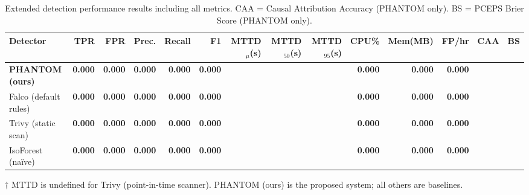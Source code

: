 \begin{table}[h]
\centering
\caption{Extended detection performance results including all metrics. CAA = Causal Attribution Accuracy (PHANTOM only). BS = PCEPS Brier Score (PHANTOM only).}
\label{tab:detection_performance_extended}
\begin{tabular}{lrrrrrrrrrrrrr}
\hline
Detector & TPR & FPR & Prec. & Recall & F1 & MTTD$_\mu$(s) & MTTD$_{50}$(s) & MTTD$_{95}$(s) & CPU\% & Mem(MB) & FP/hr & CAA & BS \\
\hline
\textbf{PHANTOM (ours)} & \textbf{0.000} & \textbf{0.000} & \textbf{0.000} & \textbf{0.000} & \textbf{0.000} & \text{---} & \text{---} & \text{---} & \textbf{0.000} & \textbf{0.000} & \textbf{0.000} & \text{---} & \text{---} \\
Falco (default rules) & \textbf{0.000} & \textbf{0.000} & \textbf{0.000} & \textbf{0.000} & \textbf{0.000} & \text{---} & \text{---} & \text{---} & \textbf{0.000} & \textbf{0.000} & \textbf{0.000} & \text{---} & \text{---} \\
Trivy (static scan) & \textbf{0.000} & \textbf{0.000} & \textbf{0.000} & \textbf{0.000} & \textbf{0.000} & \text{---} & \text{---} & \text{---} & \textbf{0.000} & \textbf{0.000} & \textbf{0.000} & \text{---} & \text{---} \\
IsoForest (na\"{i}ve) & \textbf{0.000} & \textbf{0.000} & \textbf{0.000} & \textbf{0.000} & \textbf{0.000} & \text{---} & \text{---} & \text{---} & \textbf{0.000} & \textbf{0.000} & \textbf{0.000} & \text{---} & \text{---} \\
\hline
\end{tabular}
\vspace{0.5em}
\footnotesize{$\dagger$ MTTD is undefined for Trivy (point-in-time scanner). PHANTOM (ours) is the proposed system; all others are baselines.}
\end{table}